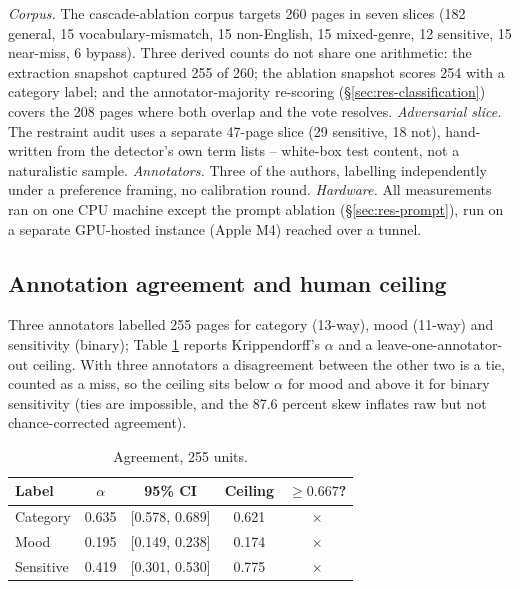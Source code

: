 \documentclass[conference]{IEEEtran}
\let\IEEEoriginalcaption\caption
\renewcommand{\caption}[1]{\IEEEoriginalcaption{\footnotesize #1}}
\newcommand{\no}{$\times$}
\begin{document}
\emph{Corpus.} The cascade-ablation corpus targets 260 pages in seven slices (182
general, 15 vocabulary-mismatch, 15 non-English, 15 mixed-genre, 12
sensitive, 15 near-miss, 6 bypass). Three derived counts do not share one
arithmetic: the extraction snapshot captured 255 of 260; the ablation
snapshot scores 254 with a category label; and the annotator-majority
re-scoring (\S\ref{sec:res-classification}) covers the 208 pages where
both overlap and the vote resolves. \emph{Adversarial slice.} The
restraint audit uses a separate 47-page slice (29 sensitive, 18 not),
hand-written from the detector's own term lists -- white-box test
content, not a naturalistic sample. \emph{Annotators.} Three of the
authors, labelling independently under a preference framing, no
calibration round. \emph{Hardware.} All measurements ran on one CPU
machine except the prompt ablation (\S\ref{sec:res-prompt}), run on a
separate GPU-hosted instance (Apple M4) reached over a tunnel.

\subsection{Annotation agreement and human ceiling}
\label{sec:res-agreement}

Three annotators labelled 255 pages for category (13-way), mood (11-way)
and sensitivity (binary); Table
\ref{tab:agreement} reports Krippendorff's $\alpha$ and a
leave-one-annotator-out ceiling. With three annotators a disagreement
between the other two is a tie, counted as a miss, so the ceiling sits
below $\alpha$ for mood and above it for binary sensitivity (ties are
impossible, and the 87.6 percent skew inflates raw but not
chance-corrected agreement).

\begin{table}[t]
\caption{Agreement, 255 units.}
\label{tab:agreement}
\begin{center}
\scriptsize
\begin{tabular}{lcccc}
\toprule
\textbf{Label} & \textbf{$\alpha$} & \textbf{95\% CI} & \textbf{Ceiling} & \textbf{$\geq 0.667$?} \\
\midrule
Category  & 0.635 & [0.578, 0.689] & 0.621 & \no \\
Mood      & 0.195 & [0.149, 0.238] & 0.174 & \no \\
Sensitive & 0.419 & [0.301, 0.530] & 0.775 & \no \\
\bottomrule
\end{tabular}
\end{center}
\end{table}
\end{document}
